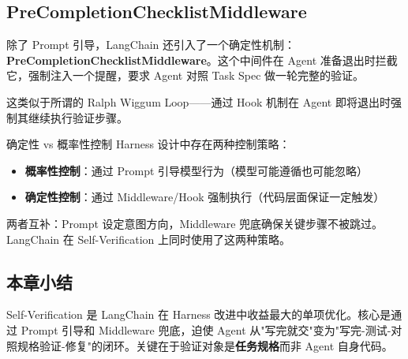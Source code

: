 \subsection{PreCompletionChecklistMiddleware}

除了 Prompt 引导，LangChain 还引入了一个确定性机制：\textbf{PreCompletionChecklistMiddleware}。这个中间件在 Agent 准备退出时拦截它，强制注入一个提醒，要求 Agent 对照 Task Spec 做一轮完整的验证。

这类似于所谓的 Ralph Wiggum Loop——通过 Hook 机制在 Agent 即将退出时强制其继续执行验证步骤。

\begin{knowledgebox}{确定性 vs 概率性控制}
Harness 设计中存在两种控制策略：
\begin{itemize}[leftmargin=1.5em]
    \item \textbf{概率性控制}：通过 Prompt 引导模型行为（模型可能遵循也可能忽略）
    \item \textbf{确定性控制}：通过 Middleware/Hook 强制执行（代码层面保证一定触发）
\end{itemize}
两者互补：Prompt 设定意图方向，Middleware 兜底确保关键步骤不被跳过。LangChain 在 Self-Verification 上同时使用了这两种策略。
\end{knowledgebox}

\subsection{本章小结}

Self-Verification 是 LangChain 在 Harness 改进中收益最大的单项优化。核心是通过 Prompt 引导和 Middleware 兜底，迫使 Agent 从"写完就交"变为"写完-测试-对照规格验证-修复"的闭环。关键在于验证对象是\textbf{任务规格}而非 Agent 自身代码。


